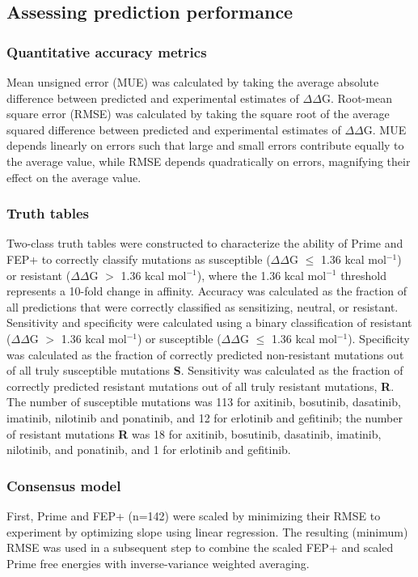 \documentclass[phd,tocprelim]{cornell}
\begin{document}
\subsection{Assessing prediction performance}

\subsubsection{Quantitative accuracy metrics}
Mean unsigned error (MUE) was calculated by taking the average absolute difference between predicted and experimental estimates of $\Delta\Delta$G. 
Root-mean square error (RMSE) was calculated by taking the square root of the average squared difference between predicted and experimental estimates of $\Delta\Delta$G. 
MUE depends linearly on errors such that large and small errors contribute equally to the average value, while RMSE depends quadratically on errors, magnifying their effect on the average value.

\subsubsection{Truth tables}
Two-class truth tables were constructed to characterize the ability of Prime and FEP+ to correctly classify mutations as susceptible ($\Delta\Delta$G $\le$ 1.36 kcal mol$^{-1}$) or resistant ($\Delta\Delta$G $>$ 1.36 kcal mol$^{-1}$), where the 1.36 kcal mol$^{-1}$ threshold represents a 10-fold change in affinity. 
Accuracy was calculated as the fraction of all predictions that were correctly classified as sensitizing, neutral, or resistant.
Sensitivity and specificity were calculated using a binary classification of resistant ($\Delta\Delta$G $>$ 1.36 kcal mol$^{-1}$) or susceptible ($\Delta\Delta$G $\le$ 1.36 kcal mol$^{-1}$). 
Specificity was calculated as the fraction of correctly predicted non-resistant mutations out of all truly susceptible mutations {\bf S}.
Sensitivity was calculated as the fraction of correctly predicted resistant mutations out of all truly resistant mutations, {\bf R}. 
The number of susceptible mutations was 113 for axitinib, bosutinib, dasatinib, imatinib, nilotinib and ponatinib, and 12 for erlotinib and gefitinib; the number of resistant mutations {\bf R} was 18 for axitinib, bosutinib, dasatinib, imatinib, nilotinib, and ponatinib, and 1 for erlotinib and gefitinib.

\subsubsection{Consensus model}
First, Prime and FEP+ (n=142) were scaled by minimizing their RMSE to experiment by optimizing slope using linear regression. The resulting (minimum) RMSE was used in a subsequent step to combine the scaled FEP+ and scaled Prime free energies with inverse-variance weighted averaging.
\end{document}
